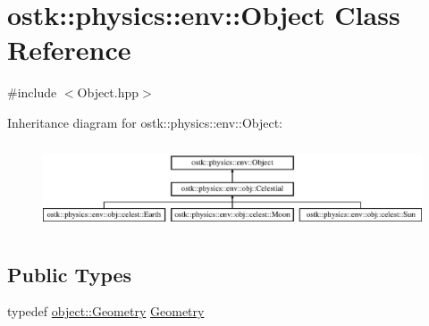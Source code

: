 \hypertarget{classostk_1_1physics_1_1env_1_1_object}{}\section{ostk\+:\+:physics\+:\+:env\+:\+:Object Class Reference}
\label{classostk_1_1physics_1_1env_1_1_object}


{\ttfamily \#include $<$Object.\+hpp$>$}

Inheritance diagram for ostk\+:\+:physics\+:\+:env\+:\+:Object\+:\begin{figure}[H]
\begin{center}
\leavevmode
\includegraphics[height=2.568807cm]{classostk_1_1physics_1_1env_1_1_object}
\end{center}
\end{figure}
\subsection*{Public Types}
\begin{DoxyCompactItemize}
\item 
typedef \hyperlink{classostk_1_1physics_1_1env_1_1object_1_1_geometry}{object\+::\+Geometry} \hyperlink{classostk_1_1physics_1_1env_1_1_object_a66e44a65aefb23a184a6de531e96935d}{Geometry}
\end{DoxyCompactItemize}
